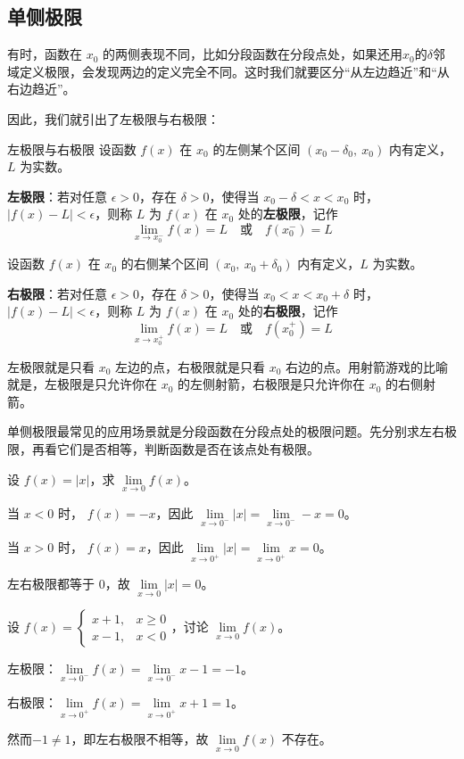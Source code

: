 \subsection{单侧极限}

有时，函数在 $x_0$ 的两侧表现不同，比如分段函数在分段点处，如果还用$x_0$的$\delta $邻域定义极限，会发现两边的定义完全不同。这时我们就要区分“从左边趋近”和“从右边趋近”。

因此，我们就引出了左极限与右极限：

\begin{definition}{左极限与右极限}{}
设函数 $f(x)$ 在 $x_0$ 的左侧某个区间 $(x_0 - \delta_0,\ x_0)$ 内有定义，$L$ 为实数。

\textbf{左极限}：若对任意 $\epsilon > 0$，存在 $\delta > 0$，使得当 $x_0 - \delta < x < x_0$ 时，$|f(x) - L| < \epsilon$，则称 $L$ 为 $f(x)$ 在 $x_0$ 处的\textbf{左极限}，记作
\[
\lim_{x \to x_0^-} f(x) = L \quad \text{或} \quad f(x_0^-) = L
\]

设函数 $f(x)$ 在 $x_0$ 的右侧某个区间 $(x_0,\ x_0 + \delta_0)$ 内有定义，$L$ 为实数。

\textbf{右极限}：若对任意 $\epsilon > 0$，存在 $\delta > 0$，使得当 $x_0 < x < x_0 + \delta$ 时，$|f(x) - L| < \epsilon$，则称 $L$ 为 $f(x)$ 在 $x_0$ 处的\textbf{右极限}，记作
\[
\lim_{x \to x_0^+} f(x) = L \quad \text{或} \quad f(x_0^+) = L
\]
\end{definition}

左极限就是只看 $x_0$ 左边的点，右极限就是只看 $x_0$ 右边的点。用射箭游戏的比喻就是，左极限是只允许你在 $x_0$ 的左侧射箭，右极限是只允许你在 $x_0$ 的右侧射箭。

单侧极限最常见的应用场景就是分段函数在分段点处的极限问题。先分别求左右极限，再看它们是否相等，判断函数是否在该点处有极限。

\begin{myexample}
  设 $f(x) = |x|$，求 $\lim\limits_{x \to 0} f(x)$。

  当 $x < 0$ 时， $f(x) = -x$，因此 $\lim\limits_{x \to 0^-} |x| = \lim\limits_{x \to 0^-} -x = 0$。

  当 $x > 0$ 时， $f(x) = x$，因此 $\lim\limits_{x \to 0^+} |x| = \lim\limits_{x \to 0^+} x = 0$。

  左右极限都等于 $0$，故 $\lim\limits_{x \to 0} |x| = 0$。
\end{myexample}

\begin{myexample}
  设 $f(x) = \begin{cases} x+1, & x \geq 0 \\ x-1, & x < 0 \end{cases}$，讨论 $\lim\limits_{x \to 0} f(x)$。

  左极限：$\lim\limits_{x \to 0^-} f(x) = \lim\limits_{x \to 0^-} x-1 = -1$。

  右极限：$\lim\limits_{x \to 0^+} f(x) = \lim\limits_{x \to 0^+} x+1 = 1$。

  然而$-1 \neq 1$，即左右极限不相等，故 $\lim\limits_{x \to 0} f(x)$ 不存在。
\end{myexample}

